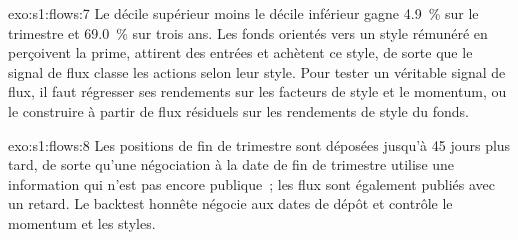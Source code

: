 \begin{solution}{exo:s1:flows:7}
Le décile supérieur moins le décile inférieur gagne 4.9~\% sur le trimestre et 69.0~\% sur trois ans. Les fonds orientés vers un style rémunéré en perçoivent la prime, attirent des entrées et
achètent ce style, de sorte que le signal de flux classe les actions selon leur style. Pour tester un véritable signal de flux, il faut régresser ses rendements sur les facteurs de style et le momentum, ou
le construire à partir de flux résiduels sur les rendements de style du fonds.
\end{solution}

\begin{solution}{exo:s1:flows:8}
Les positions de fin de trimestre sont déposées jusqu'à 45 jours plus tard, de sorte qu'une négociation à la date de fin de trimestre utilise une information qui n'est pas encore publique~; les flux sont également publiés avec un retard.
Le backtest honnête négocie aux dates de dépôt et contrôle le momentum et les styles.
\end{solution}

